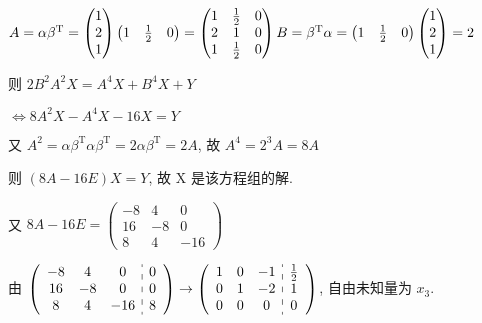      \paragraph{} %
         \( A = \alpha\beta^{\mathrm{T}} = \begin{pmatrix}
             1 \\
             2 \\
             1
         \end{pmatrix}\begin{pmatrix}
             1 & \frac{1}{2} & 0
         \end{pmatrix} = \begin{pmatrix}
             1 & \frac{1}{2} & 0 \\
             2 & 1           & 0 \\
             1 & \frac{1}{2} & 0
         \end{pmatrix} \newline B = \beta^{\mathrm{T}}\alpha = \begin{pmatrix}
             1 & \frac{1}{2} & 0
         \end{pmatrix}\begin{pmatrix}
             1 \\
             2 \\
             1
         \end{pmatrix} = 2 \)

         则 \( 2B^{2}A^{2}X = A^{4}X + B^{4}X + Y \)

         \( \Leftrightarrow 8A^{2}X - A^{4}X - 16X = Y \)

         又 \( A^{2} = \alpha\beta^{\mathrm{T}}\alpha\beta^{\mathrm{T}} = 2\alpha\beta^{\mathrm{T}} = 2A \), 故 \( A^{4} = 2^{3}A = 8A \)

         则 \( (8A - 16E)X = Y \), 故 X 是该方程组的解.

         又 \( 8A - 16E = \begin{pmatrix}
             -8 & 4  & 0   \\
             16 & -8 & 0   \\
             8  & 4  & -16
         \end{pmatrix} \)

         由 \( \left(\begin{array}{ccc:c}
                 -8 & 4  & 0   & 0 \\
                 16 & -8 & 0   & 0 \\
                 8  & 4  & -16 & 8
             \end{array}\right) \rightarrow
         \left(\begin{array}{ccc:c}
                 1 & 0 & -1 & \frac{1}{2} \\
                 0 & 1 & -2 & 1           \\
                 0 & 0 & 0  & 0
             \end{array}\right) \), 自由未知量为 \( x_{3} \).

